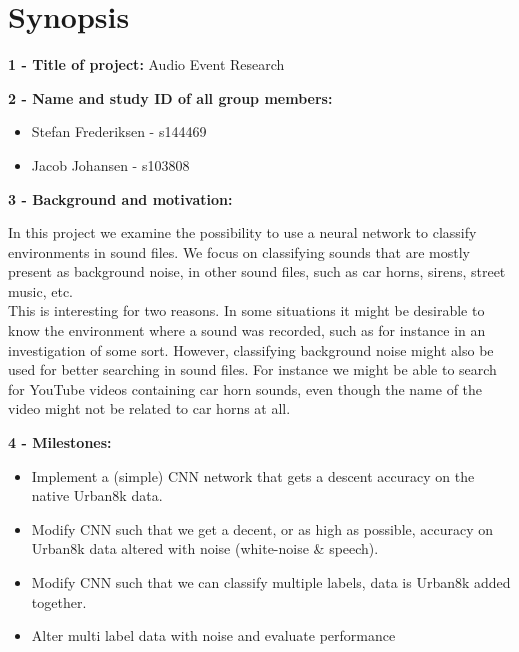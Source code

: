 \documentclass[times,12pt]{article}    %
\begin{document}
\section*{Synopsis}

\noindent \textbf{1 - Title of project:}
\noindent Audio Event Research

\noindent \textbf{2 - Name and study ID of all group members:}
\begin{itemize}
\item Stefan Frederiksen - s144469
\item Jacob Johansen - s103808
\end{itemize}

\noindent \textbf{3 - Background and motivation:}

\noindent In this project we examine the possibility to use a neural network to classify environments in sound files. We focus on classifying sounds that are mostly present as background noise, in other sound files, such as car horns, sirens, street music, etc.\\
This is interesting for two reasons. In some situations it might be desirable to know the environment where a sound was recorded, such as for instance in an investigation of some sort. However, classifying background noise might also be used for better searching in sound files. For instance we might be able to search for YouTube videos containing car horn sounds, even though the name of the video might not be related to car horns at all.

\noindent \textbf{4 - Milestones:}

\begin{itemize}
\item Implement a (simple) CNN network that gets a descent accuracy on the native Urban8k data.
\item Modify CNN such that we get a decent, or as high as possible, accuracy on Urban8k data altered with noise (white-noise \& speech).
\item Modify CNN such that we can classify multiple labels, data is Urban8k added together.
\item Alter multi label data with noise and evaluate performance
\end{itemize}
\end{document}
